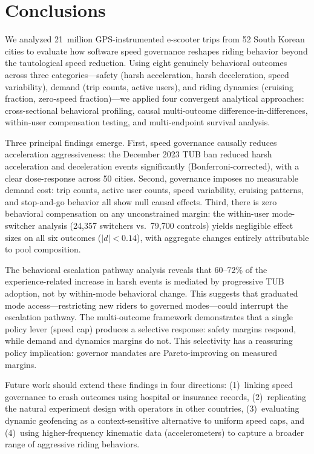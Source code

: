 \section{Conclusions}
\label{sec:conclusion}

We analyzed 21~million GPS-instrumented e-scooter trips from 52 South Korean cities to evaluate how software speed governance reshapes riding behavior beyond the tautological speed reduction. Using eight genuinely behavioral outcomes across three categories---safety (harsh acceleration, harsh deceleration, speed variability), demand (trip counts, active users), and riding dynamics (cruising fraction, zero-speed fraction)---we applied four convergent analytical approaches: cross-sectional behavioral profiling, causal multi-outcome difference-in-differences, within-user compensation testing, and multi-endpoint survival analysis.

Three principal findings emerge. First, speed governance causally reduces acceleration aggressiveness: the December 2023 TUB ban reduced harsh acceleration and deceleration events significantly (Bonferroni-corrected), with a clear dose-response across 50 cities. Second, governance imposes no measurable demand cost: trip counts, active user counts, speed variability, cruising patterns, and stop-and-go behavior all show null causal effects. Third, there is zero behavioral compensation on any unconstrained margin: the within-user mode-switcher analysis (24,357 switchers vs.\ 79,700 controls) yields negligible effect sizes on all six outcomes ($|d| < 0.14$), with aggregate changes entirely attributable to pool composition.

The behavioral escalation pathway analysis reveals that 60--72\% of the experience-related increase in harsh events is mediated by progressive TUB adoption, not by within-mode behavioral change. This suggests that graduated mode access---restricting new riders to governed modes---could interrupt the escalation pathway. The multi-outcome framework demonstrates that a single policy lever (speed cap) produces a selective response: safety margins respond, while demand and dynamics margins do not. This selectivity has a reassuring policy implication: governor mandates are Pareto-improving on measured margins.

Future work should extend these findings in four directions: (1)~linking speed governance to crash outcomes using hospital or insurance records, (2)~replicating the natural experiment design with operators in other countries, (3)~evaluating dynamic geofencing as a context-sensitive alternative to uniform speed caps, and (4)~using higher-frequency kinematic data (accelerometers) to capture a broader range of aggressive riding behaviors.
